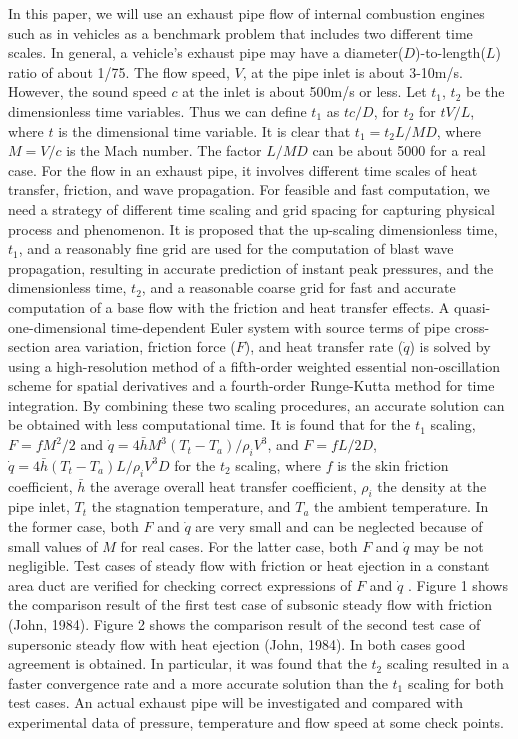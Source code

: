 \documentclass[10pt,twoside,twocolumn,letterpaper]{article}
\begin{document}
In this paper, we will use an exhaust pipe flow of internal combustion engines such as in vehicles as a benchmark problem that includes two different time scales. In general, a vehicle's exhaust pipe may have a diameter($D$)-to-length($L$) ratio of about 1/75. The flow speed, $V$, at the pipe inlet is about 3-10m/s. However, the sound speed $c$ at the inlet is about 500m/s or less. Let $t_{1}$, $t_{2}$ be the dimensionless time variables. Thus we can define $t_{1}$ as $tc/D$, for $t_{2}$ for $tV/L$, where $t$ is the dimensional time variable. It is clear that $t_{1} = t_{2}L/MD$, where $M = V/c$ is the Mach number. The factor $L/MD$ can be about 5000 for a real case. For the flow in an exhaust pipe, it involves different time scales of heat transfer, friction, and wave propagation. For feasible and fast computation, we need a strategy of different time scaling and grid spacing for capturing physical process and phenomenon. It is proposed that the up-scaling dimensionless time, $t_{1}$, and a reasonably fine grid are used for the computation of blast wave propagation, resulting in accurate prediction of instant peak pressures, and the dimensionless time, $t_{2}$, and a reasonable coarse grid for fast and accurate computation of a base flow with the friction and heat transfer effects. A quasi-one-dimensional time-dependent Euler system with source terms of pipe cross-section area variation, friction force ($F$), and heat transfer rate ($\dot{q}$) is solved by using a high-resolution method of a fifth-order weighted essential non-oscillation scheme for spatial derivatives and a fourth-order Runge-Kutta method for time integration. By combining these two scaling procedures, an accurate solution can be obtained with less computational time. It is found that for the $t_{1}$ scaling, $F=fM^2/2$ and $\dot{q}=4\bar{h}M^{3}(T_{t}-T_{a})/\rho_{i}V^{3}$, and $F=fL/2D$, $\dot{q}=4\bar{h}(T_{t}-T_{a})L/\rho_{i}V^{3}D$  for the $t_{2}$ scaling, where $f$ is the skin friction coefficient, $\bar{h}$ the average overall heat transfer coefficient, $\rho_{i}$  the density at the pipe inlet, $T_{t}$ the stagnation temperature, and $T_{a}$ the ambient temperature. In the former case, both $F$ and $\dot{q}$ are very small and can be neglected because of small values of $M$ for real cases. For the latter case, both $F$ and $\dot{q}$ may be not negligible. Test cases of steady flow with friction or heat ejection in a constant area duct are verified for checking correct expressions of $F$ and $\dot{q}$ . Figure 1 shows the comparison result of the first test case of subsonic steady flow with friction (John, 1984). Figure 2 shows the comparison result of the second test case of supersonic steady flow with heat ejection (John, 1984). In both cases good agreement is obtained. In particular, it was found that the $t_{2}$ scaling resulted in a faster convergence rate and a more accurate solution than the $t_{1}$ scaling for both test cases. An actual exhaust pipe will be investigated and compared with experimental data of pressure, temperature and flow speed at some check points.
\end{document}
